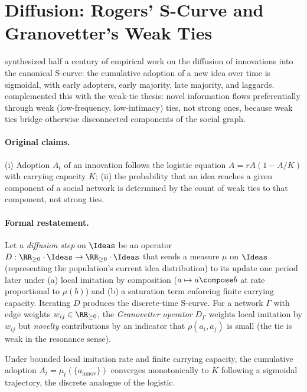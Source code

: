 \section{Diffusion: Rogers' S-Curve and Granovetter's Weak Ties}
\label{sec:diffusion}

\citet{Rogers2003} synthesized half a century of empirical work on the
diffusion of innovations into the canonical S-curve: the cumulative
adoption of a new idea over time is sigmoidal, with early adopters,
early majority, late majority, and laggards. \citet{Granovetter1973}
complemented this with the weak-tie thesis: novel information flows
preferentially through weak (low-frequency, low-intimacy) ties, not
strong ones, because weak ties bridge otherwise disconnected components
of the social graph.

\paragraph{Original claims.} (i) Adoption $A_t$ of an innovation
follows the logistic equation $\dot A = r A(1-A/K)$ with carrying
capacity $K$; (ii) the probability that an idea reaches a given
component of a social network is determined by the count of weak ties
to that component, not strong ties.

\paragraph{Formal restatement.} Let a \emph{diffusion step} on
$\Ideas$ be an operator $D:\RR_{\geq 0}\cdot\Ideas \to
\RR_{\geq 0}\cdot\Ideas$ that sends a measure $\mu$ on $\Ideas$
(representing the population's current idea distribution) to its
update one period later under (a) local imitation by composition
($a\mapsto a\compose b$ at rate proportional to $\mu(b)$) and (b) a
saturation term enforcing finite carrying capacity. Iterating $D$
produces the discrete-time S-curve. For a network $\Gamma$ with edge
weights $w_{ij}\in\RR_{\geq 0}$, the \emph{Granovetter operator}
$D_\Gamma$ weights local imitation by $w_{ij}$ but \emph{novelty}
contributions by an indicator that $\rho(a_i,a_j)$ is small (the tie
is weak in the resonance sense).

\begin{theorem}
\label{thm:rogers}
Under bounded local imitation rate and finite carrying capacity, the
cumulative adoption $A_t = \mu_t(\{a_{\mathrm{innov}}\})$ converges
monotonically to $K$ following a sigmoidal trajectory, the discrete
analogue of the logistic.
\end{theorem}

